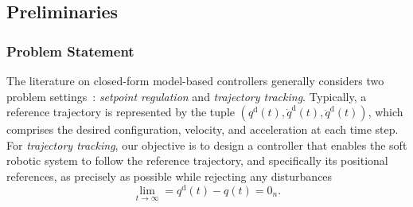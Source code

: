 \subsection{Preliminaries}

\subsubsection{Problem Statement}
The literature on closed-form model-based controllers generally considers two problem settings~\citep{sciavicco2012modelling}: \emph{setpoint regulation} and \emph{trajectory tracking}. Typically, a reference trajectory is represented by the tuple $(q^\mathrm{d}(t), \dot{q}^\mathrm{d}(t), \ddot{q}^\mathrm{d}(t))$, which comprises the desired configuration, velocity, and acceleration at each time step. For \emph{trajectory tracking}, our objective is to design a controller that enables the soft robotic system to follow the reference trajectory, and specifically its positional references, as precisely as possible while rejecting any disturbances
\begin{equation}
    \lim_{t \to \infty} = q^\mathrm{d}(t) - q(t) = 0_n.
\end{equation}
